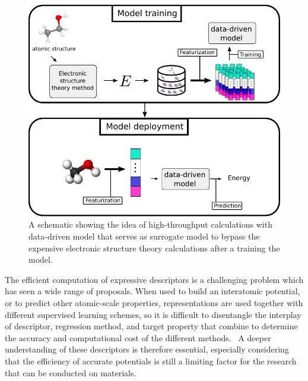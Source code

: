 \begin{figure}
    \includegraphics[width=\textwidth]{fig/slide5_0.pdf}
    \caption{A schematic showing the idea of high-throughput calculations with data-driven model that serves as surrogate model to bypass the expensive electronic structure theory calculations after a training the model.}
    \label{fig:high-throughput-scheme}
\end{figure}

The efficient computation of expressive descriptors is a challenging problem which has seen a wide range of proposals\cite{behler2011atom, rupp2012fast, bartok2013representing, huo2017unified}.
When used to build an interatomic potential, or to predict other atomic-scale properties, representations are used together with different supervised learning schemes, so it is difficult to disentangle the interplay of descriptor, regression method, and target property that combine to determine the accuracy and computational cost of the different methods.~\cite{zuo+20jpcl}
A deeper understanding of these descriptors is therefore essential, especially considering that the efficiency of accurate potentials is still a limiting factor for the research that can be conducted on materials.

